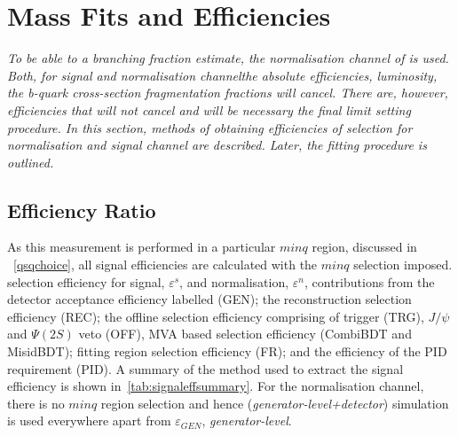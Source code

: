 \chapter{Mass Fits and Efficiencies}
\label{chap:masandef}

\textit{ To be able to \DIFdelbegin {}\DIFdelend \DIFaddbegin {}\DIFaddend a \DIFaddbegin {}\DIFaddend branching fraction estimate, the normalisation channel
of \bjpsimumuk is used. Both, for signal and normalisation
channel\DIFaddbegin \DIFadd{, }\DIFaddend the absolute efficiencies, luminosity, the b-quark cross-section \DIFdelbegin {}\DIFdelend \DIFaddbegin {}\DIFaddend fragmentation fractions will
cancel. There are, however, efficiencies that will not cancel and will be necessary \DIFdelbegin {}\DIFdelend \DIFaddbegin {}\DIFaddend the final limit setting procedure. In this section, methods of obtaining efficiencies of \DIFaddbegin {}\DIFaddend selection for \DIFaddbegin {}\DIFaddend normalisation and signal channel are described. Later, the fitting procedure is outlined.}


\section{Efficiency Ratio}
\label{EfficiencyRatio}

As this measurement is performed in a particular $minq$ region, discussed in ~\autoref{qsqchoice}, all signal efficiencies are calculated with the $minq$ selection imposed. 
\DIFdelbegin {}\DIFdelend \DIFaddbegin {}\DIFaddend selection efficiency for signal, $\varepsilon^{s}$, and normalisation, $\varepsilon^{n}$, \DIFdelbegin {}\DIFdelend \DIFaddbegin {}\DIFaddend contributions from the detector acceptance efficiency labelled (GEN); the reconstruction selection efficiency (REC); the offline selection efficiency comprising of trigger (TRG), $J/\psi$ and $\Psi(2S)$ veto (OFF), MVA based selection efficiency (CombiBDT and MisidBDT); fitting region selection efficiency (FR); and the efficiency of the PID requirement (PID). A summary of the method used to extract the signal efficiency is shown in\DIFdelbegin {}\DIFdelend ~\autoref{tab:signaleffsummary}. For the normalisation channel, there is no $minq$ region selection and hence \DIFdelbegin {}\DIFdelend \DIFaddbegin {}\DIFaddend (\textit{generator-level+detector}) simulation is used everywhere apart from \DIFaddbegin {}\DIFaddend $\varepsilon_{GEN}$, \textit{generator-level}.


